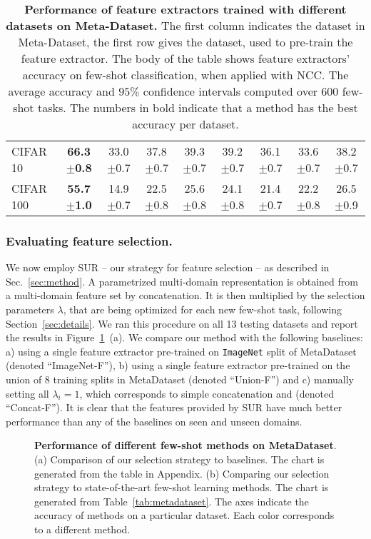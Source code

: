 \documentclass[runningheads]{llncs}
\newcommand\bb[1]{\textbf{#1}}
\newcommand{\pms}[1]{{\scriptsize $\pm$#1}}
\begin{document}
\begin{table}[t!]
\begin{center}
{\begin{tabular}{l| c c c c c c c c }
CIFAR 10     & \bb{66.3\pms{0.8}} & 33.0\pms{0.7} & 37.8\pms{0.7} & 39.3\pms{0.7} & 39.2\pms{0.7} & 36.1\pms{0.7} & 33.6\pms{0.7} & 38.2\pms{0.7} \\
CIFAR 100    & \bb{55.7\pms{1.0}} & 14.9\pms{0.7} & 22.5\pms{0.8} & 25.6\pms{0.8} & 24.1\pms{0.8} & 21.4\pms{0.7} & 22.2\pms{0.8} & 26.5\pms{0.9} \\
\hline
\end{tabular}
}
\end{center}
\caption{\bb{Performance of feature extractors trained with different datasets
  on Meta-Dataset.} The first column indicates the dataset in Meta-Dataset,
  the first row gives the dataset, used to pre-train the feature
  extractor. The body of the table shows feature extractors' accuracy on
  few-shot classification, when applied with NCC. The average accuracy and $95\%$
  confidence intervals computed over 600 few-shot tasks. The numbers in bold
  indicate that a method has the best accuracy per dataset.}
\label{tab:feature_results}
\end{table}


\subsubsection{Evaluating feature selection.} We now employ SUR -- our strategy for
feature selection -- as described in Sec.~\ref{sec:method}.
A parametrized multi-domain representation is obtained from a multi-domain feature set
by concatenation. It is then multiplied by the selection parameters
${\lambda}$, that are being optimized for each new few-shot task, following
Section~\ref{sec:details}.
We ran this procedure on all 13 testing datasets and report the results in
Figure~\ref{fig:radars}~(a). We compare our method with the
following baselines: a) using a single feature extractor pre-trained on
\texttt{ImageNet} split of MetaDataset (denoted ``ImageNet-F''), b) using a single feature
extractor pre-trained on the union of 8 training splits in MetaDataset (denoted
``Union-F'') and c)
manually setting all $\lambda_i = 1$, which corresponds to simple concatenation
and (denoted ``Concat-F'').
It is clear that the features provided by SUR have much better
performance than any of the baselines on seen and unseen domains.

\begin{figure}[t!]
\centering
\caption{\bb{Performance of different few-shot methods on MetaDataset}.
    (a) Comparison of our selection strategy to baselines. The chart is
    generated from the table in Appendix. (b) Comparing our selection strategy to
    state-of-the-art few-shot learning methods. The chart is generated from
    Table~\ref{tab:metadataset}. The axes indicate the accuracy of methods on a
    particular dataset. Each color corresponds to a different
    method.}
\label{fig:radars}
\end{figure}
\end{document}
